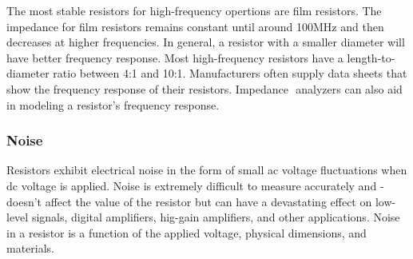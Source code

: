 \documentclass[../../document]{subfiles}
\begin{document}
The most stable resistors for high-frequency opertions are film resistors. The
impedance for film resistors remains constant until around
100\unit{\mega\hertz} and then decreases at higher frequencies. In general, a
resistor with a smaller diameter will have better frequency response. Most
high-frequency resistors have a length-to-diameter ratio between 4:1 and 10:1.
Manufacturers often supply data sheets that show the frequency response of
their resistors. Impedance ­ analyzers can also aid in modeling a resistor’s
frequency response. \cite{practical_electronics}

\subsubsection{Noise}
Resistors exhibit electrical noise in the form of small ac voltage fluctuations
when dc voltage is applied. Noise is extremely difficult to measure accurately
and ­ doesn’t affect the value of the resistor but can have a devastating
effect on low-level signals, digital amplifiers, hig-gain amplifiers, and
other applications. Noise in a resistor is a function of the applied voltage,
physical dimensions, and materials. \cite{practical_electronics}
\end{document}
